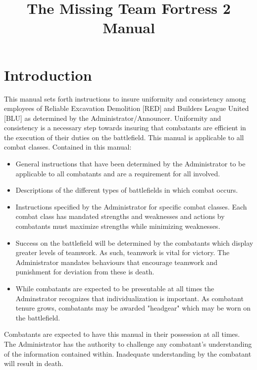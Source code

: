\documentclass[12pt]{article}
\title{The Missing Team Fortress 2 Manual}
\date{}
\begin{document}
\maketitle
\newpage
\tableofcontents


\newpage
\section{Introduction}
  \label{Introduction}
This manual sets forth instructions to insure uniformity and consistency among employees of Reliable Excavation Demolition [RED] and Builders League United [BLU] as determined by the Administrator/Announcer.  Uniformity and consistency is a necessary step towards insuring that combatants are efficient in the execution of their duties on the battlefield. This  manual is applicable to all combat classes.  Contained in this manual:

  \begin{itemize}

\item  General instructions that have been determined by the Administrator to be applicable to all combatants and are a requirement for all involved.

\item  Descriptions of the different types of battlefields in which combat occurs.

\item  Instructions specified by the Administrator for specific combat classes.  Each combat class has mandated strengths and weaknesses and actions by combatants must maximize strengths while minimizing weaknesses.

\item  Success on the battlefield will be determined by the combatants which display greater  levels of teamwork.  As such, teamwork is vital for victory. The Administrator mandates behaviours that encourage teamwork and punishment for deviation from these is death.

\item  While combatants are  expected to be presentable at all times the Adminstrator recognizes that  individualization is important.  As combatant tenure grows, combatants  may be awarded "headgear" which may be worn on the battlefield.
\end{itemize}

Combatants are expected to have this manual in their possession at all times. The Administrator has the authority to challenge any combatant's understanding of the information contained within. Inadequate understanding by the combatant will result in death.
\end{document}
